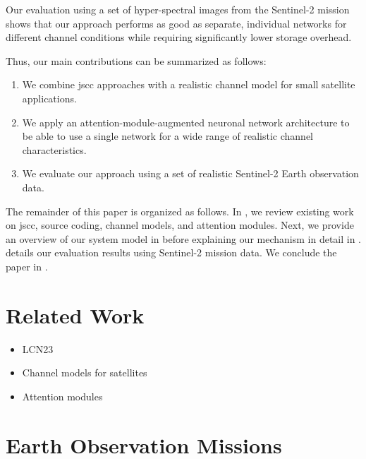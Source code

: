 \documentclass[conference]{IEEEtran}
\newcommand\sentinelii{Sentinel-2\xspace}
\begin{document}
Our evaluation using a set of hyper-spectral images from the \sentinelii mission shows that our approach performs as good as separate, individual networks for different channel conditions while requiring significantly lower storage overhead.

Thus, our main contributions can be summarized as follows:
%
\begin{enumerate}
  \item We combine \ac{jscc} approaches with a realistic channel model for small satellite applications.
  \item We apply an attention-module-augmented neuronal network architecture to be able to use a single network for a wide range of realistic channel characteristics.
  \item We evaluate our approach using a set of realistic \sentinelii Earth observation data.
\end{enumerate}

The remainder of this paper is organized as follows.
In , we review existing work on \ac{jscc}, source coding, channel models, and attention modules.
Next, we provide an overview of our system model in  before explaining our mechanism in detail in .
 details our evaluation results using \sentinelii mission data.
We conclude the paper in .

\section{Related Work}
\label{sec:related_work}

\begin{itemize}
  \item LCN23
  \item Channel models for satellites
  \item Attention modules
\end{itemize}



\section{Earth Observation Missions}
\label{sec:system_model}
\end{document}
